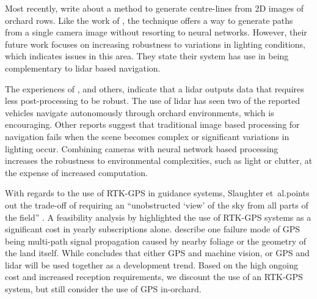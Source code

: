 \documentclass[preprint,authoryear,12pt]{elsarticle}
\begin{document}
        Most recently, \cite{Sharifi2015} write about a method to generate centre-lines from 2D images of orchard rows.
        Like the work of \cite{He2011}, the technique offers a way to generate paths from a single camera image without resorting to neural networks.
        However, their future work focuses on increasing robustness to variations in lighting conditions, which indicates issues in this area.
        They state their system has use in being complementary to lidar based navigation.

        The experiences of \cite{Scarfe2012}, and others, indicate that a lidar outputs data that requires less post-processing to be robust.
        The use of lidar has seen two of the reported vehicles navigate autonomously through orchard environments, which is encouraging.
        Other reports suggest that traditional image based processing for navigation fails when the scene becomes complex or significant variations in lighting occur.
        Combining cameras with neural network based processing increases the robustness to environmental complexities, such as light or clutter, at the expense of increased computation.

        With regards to the use of RTK-GPS in guidance systems, Slaughter et~al.\@ points out the trade-off of requiring an ``unobstructed `view' of the sky from all parts of the field'' \citep{Slaughter2008}.
        A feasibility analysis by \cite{Pedersen2006} highlighted the use of RTK-GPS systems as a significant cost in yearly subscriptions alone.
        \cite{Durrant-Whyte2005} describe one failure mode of GPS being multi-path signal propagation caused by nearby foliage or the geometry of the land itself.
        While \cite{Li2009} concludes that either GPS and machine vision, or GPS and lidar will be used together as a development trend.
        Based on the high ongoing cost and increased reception requirements, we discount the use of an RTK-GPS system, but still consider the use of GPS in-orchard.
\end{document}
